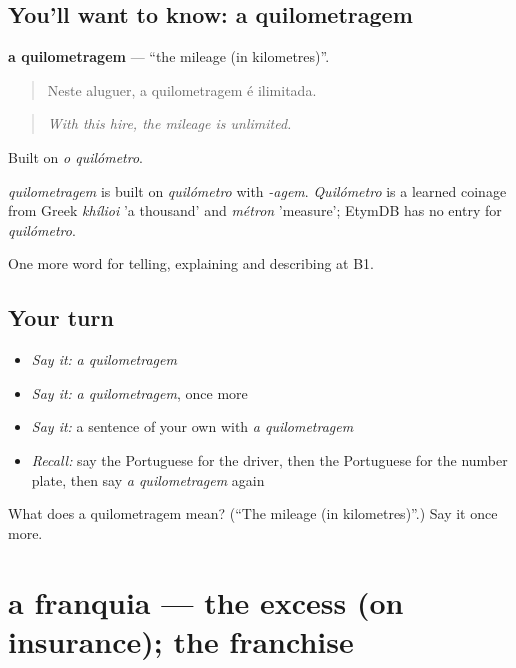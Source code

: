 \subsection*{You'll want to know: a quilometragem}
\textbf{a quilometragem} — \textquotedblleft{}the mileage (in kilometres)\textquotedblright{}.

\begin{quote}
Neste aluguer, a quilometragem é ilimitada.
\end{quote}

\begin{quote}
\emph{With this hire, the mileage is unlimited.}
\end{quote}

Built on \emph{o quilómetro}.

\begin{cousinweb}
\emph{quilometragem} is built on \emph{quilómetro} with \emph{-agem}. \emph{Quilómetro} is a learned coinage from Greek \emph{khílioi} 'a thousand' and \emph{métron} 'measure'; EtymDB has no entry for \emph{quilómetro}.
\end{cousinweb}

\begin{grammarlens}[title={What you've built}]
One more word for telling, explaining and describing at B1.
\end{grammarlens}

\subsection*{Your turn}
\begin{itemize}
\raggedright
  \item \emph{Say it:} \emph{a quilometragem}
  \item \emph{Say it:} \emph{a quilometragem}, once more
  \item \emph{Say it:} a sentence of your own with \emph{a quilometragem}
  \item \emph{Recall:} say the Portuguese for the driver, then the Portuguese for the number plate, then say \emph{a quilometragem} again
\end{itemize}

\begin{tcolorbox}[breakable,colback=teal!4,colframe=teal!35!black,title={Before you move on}]
What does a quilometragem mean? (\textquotedblleft{}The mileage (in kilometres)\textquotedblright{}.) Say it once more.
\end{tcolorbox}
\section[a franquia]{a franquia — the excess (on insurance); the franchise}

